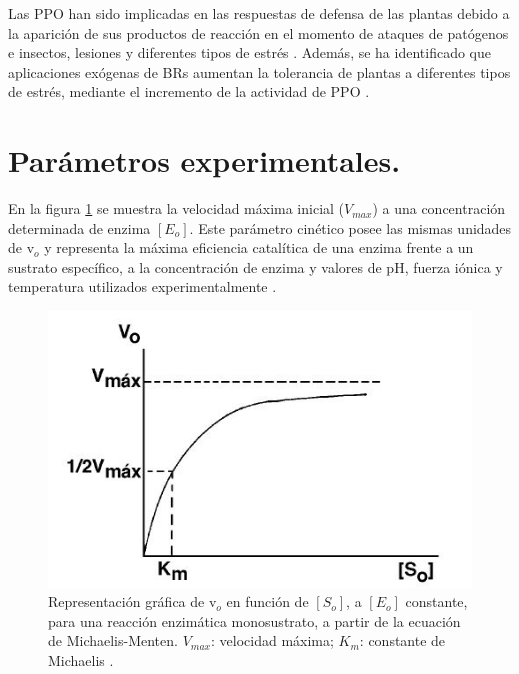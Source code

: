 Las PPO han sido implicadas en las respuestas de defensa de las plantas debido a la aparici\'on de sus productos de reacci\'on en el momento de ataques de pat\'ogenos e insectos, lesiones y diferentes tipos de estr\'es \citep{mayer1979polyphenol, constabel1995systemin, maki2006development}. Adem\'as, se ha identificado que aplicaciones ex\'ogenas de BRs aumentan la tolerancia de plantas a diferentes tipos de estr\'es, mediante el incremento de la actividad de PPO \citep{sharma2010regulation, sharma2012effect, el2012brassinolide}.\\

\section{Par\'ametros experimentales.}

En la figura \ref{curva} se muestra la velocidad máxima inicial ($V_{max}$) a una concentración determinada de enzima $[E_o]$. Este par\'ametro cin\'etico posee las mismas unidades de v$_o$ y representa la máxima eficiencia catalítica de una enzima frente a un sustrato específico, a la concentración de enzima y valores de pH, fuerza iónica y temperatura utilizados experimentalmente \citep{chavez1990temas}.\\

\begin{figure}[hbtp]
	\centering
	\includegraphics[scale=0.8]{Imagenes/curva}
	\caption{Representación gráfica de v$_o$ en función de $[S_o]$, a $[E_o]$ constante, para una reacción enzimática monosustrato, a partir de la ecuación de Michaelis-Menten. $V_{max}$: velocidad máxima; $K_m$: constante de Michaelis \citep{chavez1990temas}.}
	\label{curva}
\end{figure}

